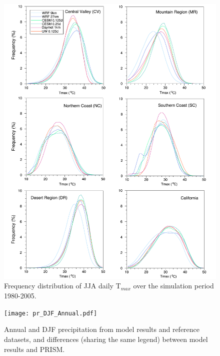 \documentclass[draft,ms]{agutex}   %
\begin{document}
\begin{figure}
\begin{center}
\includegraphics[width=6in]{PDF_t2max_allzones_JJA.pdf}
\end{center}
\caption{Frequency distribution of JJA daily T$_{max}$ over the simulation period 1980-2005.} \label{fig:Figure 8}
\end{figure}


\begin{figure}
\begin{center}
\texttt{[image: pr\_DJF\_Annual.pdf]}
\end{center}
\caption{Annual and DJF precipitation from model results and reference datasets, and differences (sharing the same legend) between model results and PRISM.} \label{fig:Figure 9}
\end{figure}
\end{document}

